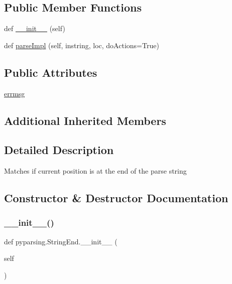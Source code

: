 \subsection*{Public Member Functions}
\begin{DoxyCompactItemize}
\item 
def \hyperlink{classpyparsing_1_1StringEnd_a27f6dd2d01e976891720f34298f84212}{\+\_\+\+\_\+init\+\_\+\+\_\+} (self)
\item 
def \hyperlink{classpyparsing_1_1StringEnd_a2038c17dfb0d6764fa8c52c784c60e59}{parse\+Impl} (self, instring, loc, do\+Actions=True)
\end{DoxyCompactItemize}
\subsection*{Public Attributes}
\begin{DoxyCompactItemize}
\item 
\hyperlink{classpyparsing_1_1StringEnd_adf5f3e56762c9c915b9cb1c16e83bb64}{errmsg}
\end{DoxyCompactItemize}
\subsection*{Additional Inherited Members}


\subsection{Detailed Description}
\begin{DoxyVerb}Matches if current position is at the end of the parse string
\end{DoxyVerb}
 

\subsection{Constructor \& Destructor Documentation}
\mbox{\label{classpyparsing_1_1StringEnd_a27f6dd2d01e976891720f34298f84212}} 
\subsubsection{\texorpdfstring{\+\_\+\+\_\+init\+\_\+\+\_\+()}{\_\_init\_\_()}}
{\footnotesize\ttfamily def pyparsing.\+String\+End.\+\_\+\+\_\+init\+\_\+\+\_\+ (\begin{DoxyParamCaption}\item[{}]{self }\end{DoxyParamCaption})}




